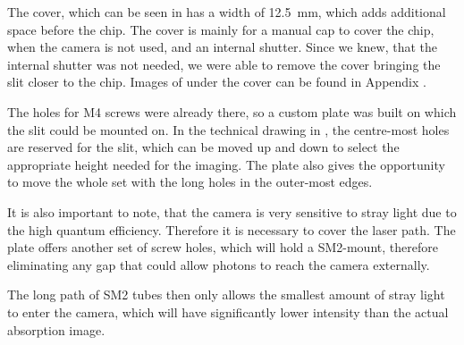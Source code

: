 The cover, which can be seen in  has a width of \SI{12.5}{\milli\meter}, which adds additional space before the chip. The cover is mainly for a manual cap to cover the chip, when the camera is not used, and an internal shutter. Since we knew, that the internal shutter was not needed, we were able to remove the cover bringing the slit closer to the chip. Images of under the cover can be found in Appendix .

The holes for M4 screws were already there, so a custom plate was built on which the slit could be mounted on.
In the technical drawing in , the centre-most holes are reserved for the slit, which can be moved up and down to select the appropriate height needed for the imaging.
The plate also gives the opportunity to move the whole set with the long holes in the outer-most edges.

It is also important to note, that the camera is very sensitive to stray light due to the high quantum efficiency. Therefore it is necessary to cover the laser path. The plate offers another set of screw holes, which will hold a SM2-mount, therefore eliminating any gap that could allow photons to reach the camera externally.

The long path of SM2 tubes then only allows the smallest amount of stray light to enter the camera, which will have significantly lower intensity than the actual absorption image.